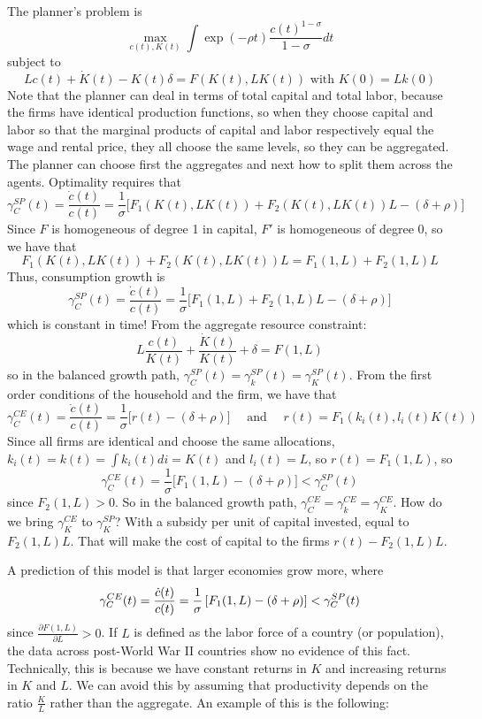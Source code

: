 \documentclass[10pt]{article}
\begin{document}
\begin{model}
	The planner's problem is \[\max_{c(t),K(t)} \int \exp(-\rho t) \frac{c(t)^{1-\sigma}}{1-\sigma} dt \]subject to\[Lc(t) + \dot{K}(t) - K(t) \delta = F(K(t) ,LK(t)) \text{ with } K(0) = Lk(0)\]Note that the planner can deal in terms of total capital and total labor, because the firms have identical production functions, so when they choose capital and labor so that the marginal products of capital and labor respectively equal the wage and rental price, they all choose the same levels, so they can be aggregated. The planner can choose first the aggregates and next how to split them across the agents. Optimality requires that \[\gamma_C^{SP}(t) = \frac{\dot{c}(t)}{c(t)} = \frac{1}{\sigma} \Big[ F_1(K(t),LK(t)) + F_2(K(t),LK(t))L - (\delta + \rho)\Big]\]Since $F$ is homogeneous of degree 1 in capital, $F'$ is homogeneous of degree 0, so we have that \[F_1(K(t),LK(t)) + F_2(K(t),LK(t))L = F_1(1,L) + F_2(1,L)L\]Thus, consumption growth is\[\gamma_C^{SP}(t) = \frac{\dot{c}(t)}{c(t)} = \frac{1}{\sigma} \Big[F_1(1,L) + F_2(1,L)L - (\delta+\rho)\Big]\]which is constant in time! From the aggregate resource constraint:\[L \frac{c(t)}{K(t)} + \frac{\dot{K}(t)}{K(t)} + \delta = F(1,L)\]so in the balanced growth path, $\gamma_C^{SP}(t) = \gamma_k^{SP}(t) = \gamma_K^{SP}(t)$. From the first order conditions of the household and the firm, we have that \[\gamma_C^{CE}(t) = \frac{\dot{c}(t)}{c(t)} = \frac{1}{\sigma}\Big[ r(t) - (\delta + \rho)\Big] \quad \text{ and } \quad r(t) = F_1(k_i(t),l_i(t)K(t)) \]Since all firms are identical and choose the same allocations, $k_i(t) = k(t) = \int k_i(t) di = K(t)$ and $l_i(t) = L$, so $r(t) = F_1(1,L)$, so\[\gamma_C^{CE}(t) = \frac{1}{\sigma} \Big[F_1(1,L) - (\delta+ \rho)\Big]< \gamma_C^{SP}(t)\]since $F_2(1,L) > 0$. So in the balanced growth path, $\gamma_C^{CE} = \gamma_k^{CE} = \gamma_K^{CE}$. How do we bring $\gamma_K^{CE}$ to $\gamma_K^{SP}$? With a subsidy per unit of capital invested, equal to $F_2(1,L)L$. That will make the cost of capital to the firms $r(t) - F_2(1,L)L$.
	\end{model}
	\begin{remark}
		A prediction of this model is that larger economies grow more, where \[\gamma_C^{CE}(t) = \frac{\dot{c}(t)}{c(t)} = \frac{1}{\sigma} \left[ F_1(1,L)- (\delta + \rho)\right] < \gamma_C^{SP}(t)\]since $\frac{\partial F(1,L)}{\partial L}> 0$. If $L$ is defined as the labor force of a country (or population), the data across post-World War II countries show no evidence of this fact. Technically, this is because we have constant returns in $K$ and increasing returns in $K$ and $L$. We can avoid this by assuming that productivity depends on the ratio $\frac{K}{L}$ rather than the aggregate. An example of this is the following:
	\end{remark}
\end{document}
